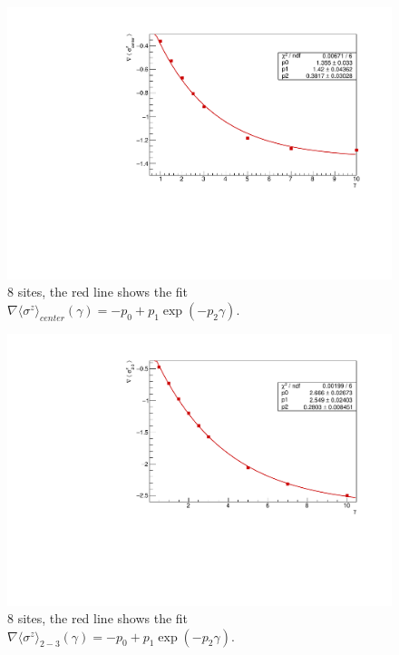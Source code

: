 \begin{figure}[H]
    \centering
    \includegraphics[scale=0.7]{Figures/8sites/FIT_8sites_gradLMcenterVSgamma.pdf}
    \caption{8 sites, the red line shows the fit \\$\nabla \langle\sigma^z\rangle_{center}(\gamma) = -p_0+p_1\exp{(-p_2\gamma)}$.}
    \label{fig:FIT_8sites_gradLMcenterVSgamma}
\end{figure}

\begin{figure}[H]
    \centering
    \includegraphics[scale=0.7]{Figures/8sites/FIT_8sites_gradLM23VSgamma.pdf}
    \caption{8 sites, the red line shows the fit \\$\nabla \langle\sigma^z\rangle_{2-3}(\gamma) = -p_0+p_1\exp{(-p_2\gamma)}$.}
    \label{fig:FIT_8sites_gradLM23VSgamma}
\end{figure}

